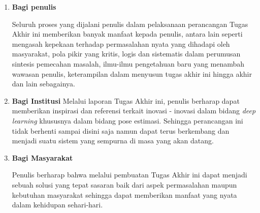 \begin{enumerate}[nolistsep]

  \item \textbf{Bagi penulis}

      Seluruh proses yang dijalani penulis dalam pelaksanaan perancangan Tugas Akhir ini
      memberikan banyak manfaat kepada penulis, antara lain seperti mengasah kepekaan
      terhadap permasalahan nyata yang dihadapi oleh masyarakat, pola pikir yang kritis, logis
      dan sistematis dalam perumusan sintesis pemecahan masalah, ilmu-ilmu pengetahuan
      baru yang menambah wawasan penulis, keterampilan dalam menyusun tugas akhir ini
      hingga akhir dan lain sebagainya.

        \vspace{2ex}

  \item \textbf{Bagi Institusi}
      Melalui laporan Tugas Akhir ini, penulis berharap dapat memberikan inspirasi dan
      referensi terkait inovasi - inovasi dalam bidang \emph{deep learning} khususnya dalam bidang pose estimasi.
      Sehingga perancangan ini tidak berhenti sampai disini saja namun
      dapat terus berkembang dan menjadi suatu sistem yang sempurna di masa yang akan datang.
        
        \vspace{2ex}

  \item \textbf{Bagi Masyarakat}

      Penulis berharap bahwa melalui pembuatan Tugas Akhir ini dapat menjadi sebuah solusi yang
      tepat sasaran baik dari aspek permasalahan maupun kebutuhan masyarakat sehingga dapat
      memberikan manfaat yang nyata dalam kehidupan sehari-hari.
  
\end{enumerate}
